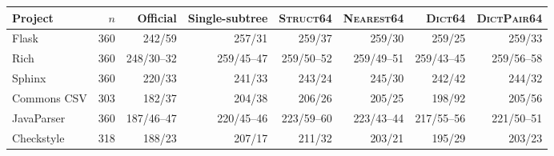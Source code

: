 \begin{tabular}{lrrrrrrr}
\toprule
Project & $n$ & Official & Single-subtree & \textsc{Struct64} & \textsc{Nearest64} & \textsc{Dict64} & \textsc{DictPair64} \\
\midrule
Flask & 360 & 242/59 & 257/31 & 259/37 & 259/30 & 259/25 & 259/33 \\
Rich & 360 & 248/30--32 & 259/45--47 & 259/50--52 & 259/49--51 & 259/43--45 & 259/56--58 \\
Sphinx & 360 & 220/33 & 241/33 & 243/24 & 245/30 & 242/42 & 244/32 \\
Commons CSV & 303 & 182/37 & 204/38 & 206/26 & 205/25 & 198/92 & 205/56 \\
JavaParser & 360 & 187/46--47 & 220/45--46 & 223/59--60 & 223/43--44 & 217/55--56 & 221/50--51 \\
Checkstyle & 318 & 188/23 & 207/17 & 211/32 & 203/21 & 195/29 & 203/23 \\
\bottomrule
\end{tabular}
